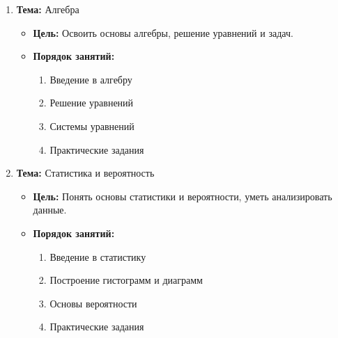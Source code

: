\documentclass{article}
\begin{document}
\begin{enumerate}[label=\textbf{\arabic*.}]
\item \textbf{Тема:} Алгебра
    \begin{itemize}
        \item \textbf{Цель:} Освоить основы алгебры, решение уравнений и задач.
        \item \textbf{Порядок занятий:}
            \begin{enumerate}
                \item Введение в алгебру
                \item Решение уравнений
                \item Системы уравнений
                \item Практические задания
            \end{enumerate}
    \end{itemize}

\item \textbf{Тема:} Статистика и вероятность
    \begin{itemize}
        \item \textbf{Цель:} Понять основы статистики и вероятности, уметь анализировать данные.
        \item \textbf{Порядок занятий:}
            \begin{enumerate}
                \item Введение в статистику
                \item Построение гистограмм и диаграмм
                \item Основы вероятности
                \item Практические задания
            \end{enumerate}
    \end{itemize}

\end{enumerate}
\end{document}
